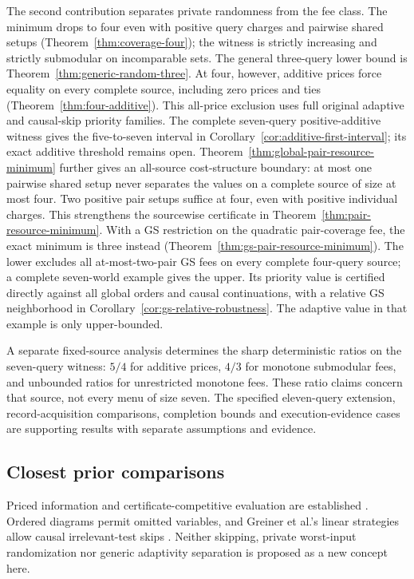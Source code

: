 \documentclass[pdflatex,sn-mathphys-num]{sn-jnl}
\theoremstyle{thmstyleone}
\theoremstyle{thmstylethree}
\theoremstyle{thmstyletwo}
\begin{document}
The second contribution separates private randomness from the fee class.
The minimum drops to four even with positive query charges and pairwise
shared setups (Theorem~\ref{thm:coverage-four}); the witness is strictly
increasing and strictly submodular on incomparable sets. The general
three-query lower bound is Theorem~\ref{thm:generic-random-three}.
At four, however, additive prices force equality on every complete source,
including zero prices and ties (Theorem~\ref{thm:four-additive}). This
all-price exclusion uses full original adaptive and causal-skip priority
families. The complete seven-query positive-additive witness gives the
five-to-seven interval in Corollary~\ref{cor:additive-first-interval};
its exact additive threshold remains open.
Theorem~\ref{thm:global-pair-resource-minimum} further gives an all-source
cost-structure boundary: at most one pairwise shared setup never separates
the values on a complete source of size at most four. Two positive pair
setups suffice at four, even with positive individual charges. This
strengthens the sourcewise certificate in
Theorem~\ref{thm:pair-resource-minimum}.
With a GS restriction on the quadratic pair-coverage fee, the exact
minimum is three instead (Theorem~\ref{thm:gs-pair-resource-minimum}).
The lower excludes all at-most-two-pair GS fees on every complete
four-query source; a complete seven-world example gives the upper.
Its priority value is certified directly against all global orders
and causal continuations, with a relative GS neighborhood in
Corollary~\ref{cor:gs-relative-robustness}. The adaptive value in
that example is only upper-bounded.

A separate fixed-source analysis determines the sharp deterministic
ratios on the seven-query witness: $5/4$ for additive prices, $4/3$ for
monotone submodular fees, and unbounded ratios for unrestricted monotone
fees. These ratio claims concern that source, not every menu of size seven.
The specified eleven-query extension, record-acquisition comparisons,
completion bounds and execution-evidence cases are supporting results
with separate assumptions and evidence.

\subsection{Closest prior comparisons}
Priced information and certificate-competitive evaluation are established
\cite{charikar02,cicalese14}. Ordered diagrams permit omitted variables,
and Greiner et al.'s linear strategies allow causal irrelevant-test skips
\cite{greiner}. Neither skipping, private worst-input randomization nor
generic adaptivity separation is proposed as a new concept here.
\end{document}
